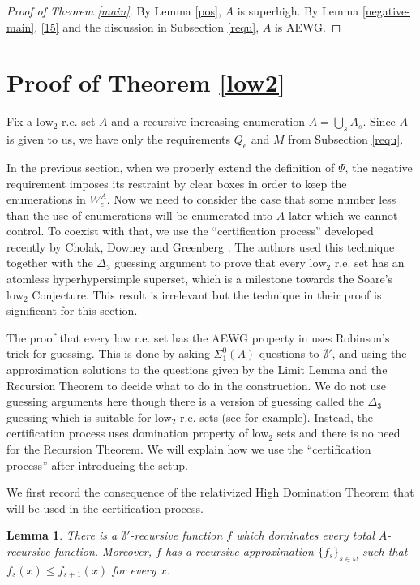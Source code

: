 \documentclass[10pt,a4paper]{amsart}
\newtheorem{lemma}[theorem]{Lemma}
\begin{document}
\begin{proof}[Proof of Theorem \ref{main}]
By Lemma \ref{pos}, $A$ is superhigh.  By Lemma \ref{negative-main}, \ref{15} and the discussion in Subsection \ref{requ}, $A$ is AEWG.
\end{proof}


\section{Proof of Theorem \ref{low2}}

Fix a $\text{low}_2$ r.e.
set $A$ and a recursive increasing enumeration $A=\bigcup_s A_s$. Since $A$ is given to us, we have only 
the requirements $Q_e$ and $M$ from Subsection \ref{requ}.

In the previous section, when we properly extend the definition of $\Psi$, the negative
requirement imposes its restraint by clear boxes in order to keep the
enumerations in $W_e^A$. Now we need to consider the case that some
number less than the use of enumerations will be enumerated into $A$ later which we cannot control.
To coexist with that, we use the ``certification process'' developed recently
by Cholak, Downey and Greenberg {\cite{CDG}}. The authors used this technique together with the $\Delta_3$ guessing argument
to prove that every $\text{low}_2$ r.e. set has an atomless hyperhypersimple superset, which is a milestone towards the Soare's $\text{low}_2$ Conjecture. This result is irrelevant but the technique in their proof is significant for this section. 

The proof that every low r.e. set has the AEWG property in \cite{MR4741732} uses Robinson's trick for guessing. This is done by asking $\Sigma^{0}_1(A)$ questions to $\emptyset'$, and using the approximation solutions to the questions given by the Limit Lemma and the Recursion Theorem to decide what to do in the construction. We do not use guessing arguments here though there is a version of guessing called the $\Delta_3$ guessing which is suitable for low$_2$ r.e. sets (see \cite{CDG} for example). Instead, the certification process uses domination property of low$_2$ sets and there is no need for the Recursion Theorem. We will explain how we use the ``certification process'' after introducing the setup.

We first record the consequence of the relativized High Domination Theorem
that will be used in the certification process.

\begin{lemma}\label{low2:dominating-approximation}
There is a $\emptyset'$-recursive function $f$ which dominates every
total $A$-recursive function. Moreover, $f$ has a recursive approximation
$\{f_s\}_{s\in\omega}$ such that $f_s(x)\leq f_{s+1}(x)$
for every $x$.
\end{lemma}
\end{document}
